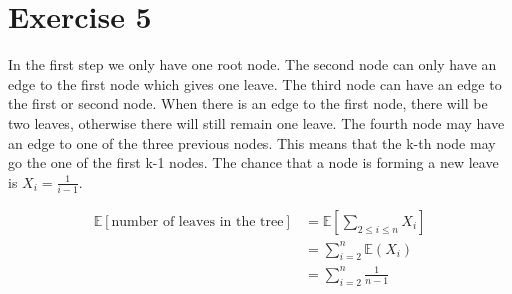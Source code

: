 \documentclass{article}
\begin{document}
\section*{Exercise 5}
In the first step we only have one root node. The second node can only have an edge to the first node which gives one leave. The third node can have an edge to the first or second node. When there is an edge to the first node, there will be two leaves, otherwise there will still remain one leave. The fourth node may have an edge to one of the three previous nodes. This means that the k-th node may go the one of the first k-1 nodes. The chance that a node is forming a new leave is $X_i = \frac{1}{i-1}$.

\begin{align*}
  \mathbb{E}[\text{number of leaves in the tree}] &= \mathbb{E}
  \left[
  \sum_{2 \leq i \leq n} X_i
  \right] \\
  &= \sum^{n}_{i = 2} \mathbb{E}( X_i ) \\
  &= \sum^{n}_{i = 2} \frac{1}{n-1}
\end{align*}
\end{document}
